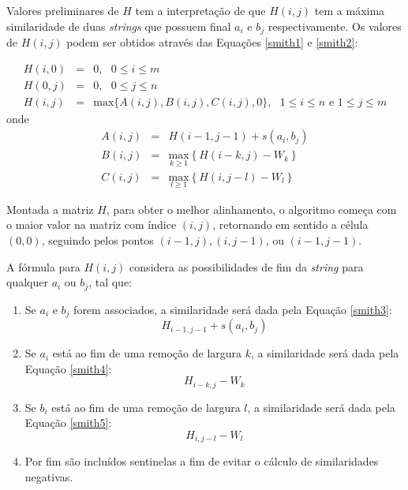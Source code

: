 Valores preliminares de $H$ tem a interpretação de que $H(i,j)$ tem a máxima similaridade de duas \textit{strings} que possuem final $a_i$ e $b_j$ respectivamente. Os valores de $H(i,j)$ podem ser obtidos através das Equações \ref{smith1} e \ref{smith2}:

\begin{eqnarray}\label{smith1}
	H(i,0) &=& 0, \, \, \, \, 0 \leq i \leq m \\
	H(0,j) &=& 0, \, \, \, \, 0 \leq j \leq n \\
	H(i,j) &=& \text{max}\lbrace A(i,j), B(i,j), C(i,j), 0\rbrace, \, \, \, \, 1 \leq i \leq n \text{ e } 1 \leq j \leq m
\end{eqnarray}
onde
\begin{eqnarray}\label{smith2}
		A(i, j) &=& H(i-1,j-1) + s(a_i,b_j) \\
		B(i, j) &=& \underset{k\geq1}{\text{max}} \left\{H(i-k,j) - W_k\right\}\\ 
		C(i, j) &=& \underset{l\geq1}{\text{max}} \left\{H(i,j-l) - W_l\right\}
\end{eqnarray}

Montada a matriz $H$, para obter o melhor alinhamento, o algoritmo começa com o maior valor na matriz com índice $(i,j)$, retornando em sentido a célula $(0,0)$, seguindo pelos pontos $(i - 1,j), (i, j - 1)$, ou $(i - 1, j - 1)$.

A fórmula para $H(i,j)$ considera as possibilidades de fim da \textit{string} para qualquer $a_i$ ou $b_j$, tal que:

\begin{enumerate}
	\item Se $a_i$ e $b_j$ forem associados, a similaridade será dada pela Equação \ref{smith3}:
	\begin{equation}\label{smith3}
		H_{i-1,j-1} + s(a_i,b_j)
	\end{equation}
	\item Se $a_i$ está ao fim de uma remoção de largura $k$, a similaridade será dada pela Equação \ref{smith4}:
	\begin{equation}\label{smith4}
		H_{i-k,j} - W_k
	\end{equation}
	\item Se $b_i$ está ao fim de uma remoção de largura $l$, a similaridade será dada pela Equação \ref{smith5}:
	\begin{equation}\label{smith5}
		H_{i,j-l} - W_l
	\end{equation}
	\item Por fim são incluídos sentinelas a fim de evitar o cálculo de similaridades negativas.
\end{enumerate}


